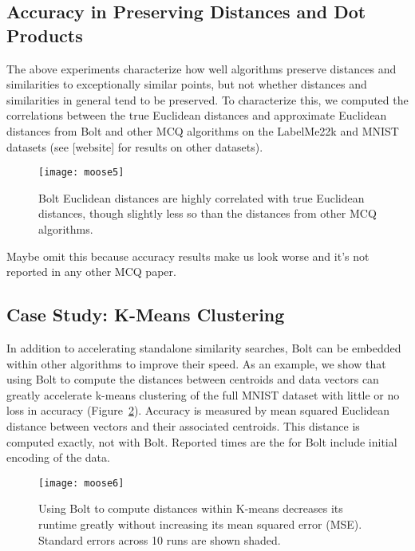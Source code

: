 \subsection{Accuracy in Preserving Distances and Dot Products}

The above experiments characterize how well algorithms preserve distances and similarities to exceptionally similar points, but not whether distances and similarities in general tend to be preserved. To characterize this, we computed the correlations between the true Euclidean distances and approximate Euclidean distances from Bolt and other MCQ algorithms on the LabelMe22k and MNIST datasets (see [website] for results on other datasets).

\begin{figure}[h]
\begin{center}
\label{fig:corr_acc}
\texttt{[image: moose5]}
\vspace*{-1mm}
\caption{Bolt Euclidean distances are highly correlated with true Euclidean distances, though slightly less so than the distances from other MCQ algorithms.}
\end{center}
\end{figure}

Maybe omit this because accuracy results make us look worse and it's not reported in any other MCQ paper.


\subsection{Case Study: K-Means Clustering}

In addition to accelerating standalone similarity searches, Bolt can be embedded within other algorithms to improve their speed. As an example, we show that using Bolt to compute the distances between centroids and data vectors can greatly accelerate k-means clustering of the full MNIST dataset with little or no loss in accuracy (Figure~\ref{fig:kmeans}). Accuracy is measured by mean squared Euclidean distance between vectors and their associated centroids. This distance is computed exactly, not with Bolt. Reported times are the for Bolt include initial encoding of the data.

\begin{figure}[h]
\begin{center}
\label{fig:kmeans}
\texttt{[image: moose6]}
\vspace*{-1mm}
\caption{Using Bolt to compute distances within K-means decreases its runtime greatly without increasing its mean squared error (MSE). Standard errors across 10 runs are shown shaded.}
\end{center}
\end{figure}

